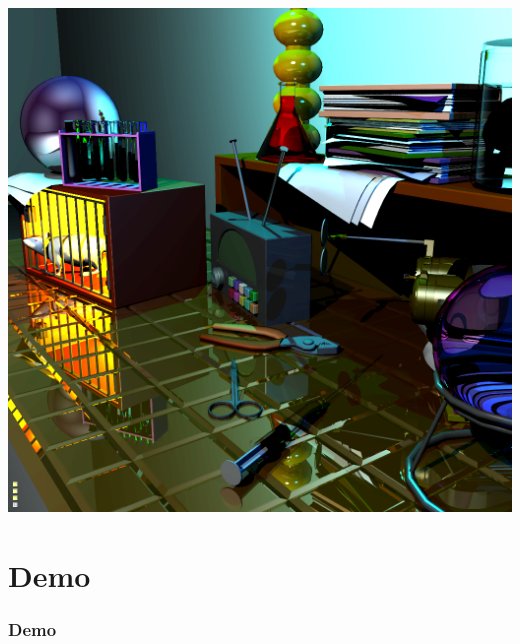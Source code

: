 \documentclass[11pt]{beamer}
\begin{document}
\begin{frame}[allowframebreaks]
\framebreak
\begin{center}
\includegraphics[width=0.6\linewidth]{../madlabcomplete_light}
\end{center}

\end{frame}



\section{Demo}
\begin{frame}[allowframebreaks]
\frametitle{Demo}

\begin{center}
\end{center}

\end{frame}
\end{document}
